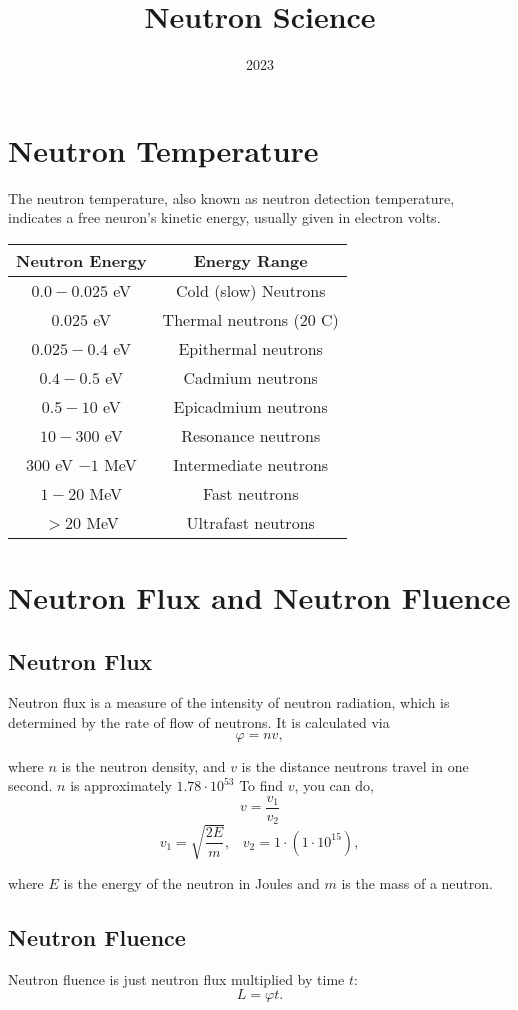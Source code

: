 \documentclass{article}
\title{Neutron Science}
\author{}
\date{2023}
\begin{document}
  \maketitle
  \begin{multicols*}{2}
    \section{Neutron Temperature}
    The neutron temperature, also known as neutron detection temperature,
    indicates a free neuron's kinetic energy, usually given in electron volts.\\
    
    \begin{tabular}{|c|c|}
      \hline
      \textbf{Neutron Energy} & \textbf{Energy Range} \\
      \hline
      $0.0 - 0.025$ eV & Cold (slow) Neutrons \\
      $0.025$ eV & Thermal neutrons ($20$ C) \\
      $0.025-0.4$ eV & Epithermal neutrons \\
      $0.4-0.5$ eV & Cadmium neutrons \\
      $0.5-10$ eV & Epicadmium neutrons \\
      $10-300$ eV & Resonance neutrons \\
      $300$ eV $- 1$ MeV & Intermediate neutrons \\
      $1-20$ MeV & Fast neutrons \\
      $> 20$ MeV & Ultrafast neutrons \\
      \hline
    \end{tabular}


    \section{Neutron Flux and Neutron Fluence}
    \subsection{Neutron Flux}
    Neutron flux is a measure of the intensity of neutron radiation,
    which is determined by the rate of flow of neutrons. It is calculated
    via
    \[
      \varphi = nv,
    \] 

    where $n$ is the neutron density, and $v$ is the distance neutrons travel
    in one second. $n$ is approximately $1.78\cdot 10^{53}$ To find $v$, you can do,
      \[
        v = \frac{v_1}{v_2}
      \]\[
        v_1 = \sqrt{\frac{2E}{m}},\;\;\;
        v_2 = 1 \cdot \left(1 \cdot 10^{15}\right),
      \]

      where $E$ is the energy of the neutron in Joules and $m$ is the mass of a neutron.

    \subsection{Neutron Fluence}
    Neutron fluence is just neutron flux multiplied by time $t$:
    \[
      L = \varphi{t}.
    \]
  \end{multicols*}
\end{document}
